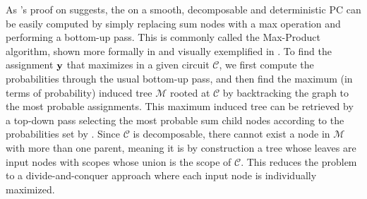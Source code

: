 As 's proof on  suggests, the \map{} on a smooth, decomposable
and deterministic PC can be easily computed by simply replacing sum nodes with a max operation and
performing a bottom-up \evi{} pass. This is commonly called the Max-Product algorithm, shown more
formally in  and visually exemplified in . To find the assignment
$\mathbf{y}$ that maximizes  in a given circuit $\mathcal{C}$, we first compute the
\map{} probabilities through the usual bottom-up pass, and then find the maximum (in terms of
probability) induced tree $\mathcal{M}$ rooted at $\mathcal{C}$ by backtracking the graph to the
most probable assignments. This maximum induced tree can be retrieved by a top-down pass selecting
the most probable sum child nodes according to the probabilities set by \map{}. Since $\mathcal{C}$
is decomposable, there cannot exist a node in $\mathcal{M}$ with more than one parent, meaning it
is by construction a tree whose leaves are input nodes with scopes whose union is the scope of
$\mathcal{C}$. This reduces the problem to a divide-and-conquer approach where each input node is
individually maximized.


